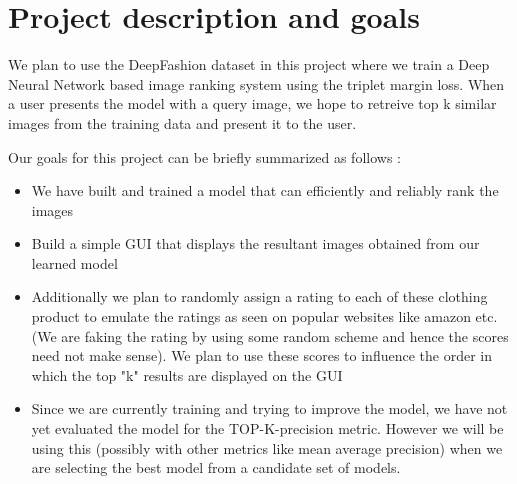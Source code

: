 \section{Project description and goals}
We plan to use the DeepFashion\cite{liu2016deepfashion} dataset in this project where we train a Deep Neural Network based image ranking system using the triplet margin loss. When a user presents the model with a query image, we hope to retreive top k similar images from the training data and present it to the user. 

Our goals for this project can be briefly summarized as follows :
\begin{itemize}
    \item We have built and trained a model that can efficiently and reliably rank the images
    \item Build a simple GUI that displays the resultant images obtained from our learned model
    \item Additionally we plan to randomly assign a rating to each of these clothing product to emulate the ratings as seen on popular websites like amazon etc. (We are faking the rating by using some random scheme and hence the scores need not make sense). We plan to use these scores to influence the order in which the top "k" results are displayed on the GUI
    \item Since we are currently training and trying to improve the model, we have not yet evaluated the model for the TOP-K-precision metric. However we will be using this (possibly with other metrics like mean average precision) when we are selecting the best model from a candidate set of models.
\end{itemize}



